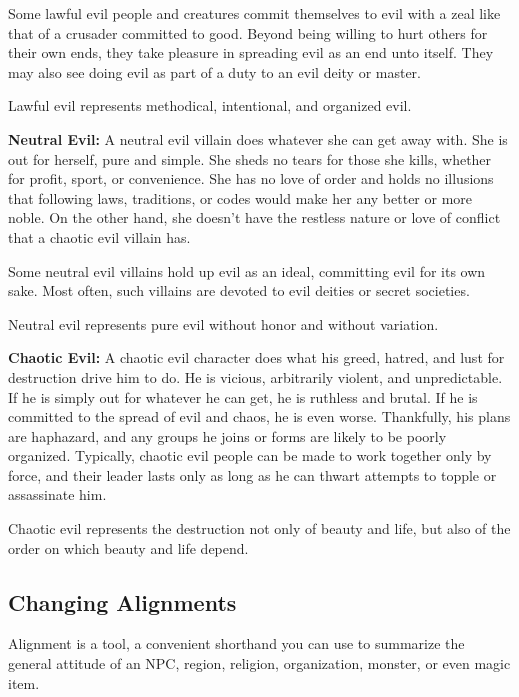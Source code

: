Some lawful evil people and creatures commit themselves to evil with a zeal like that of a crusader committed to good. Beyond being willing to hurt others for their own ends, they take pleasure in spreading evil as an end unto itself. They may also see doing evil as part of a duty to an evil deity or master.
				
Lawful evil represents methodical, intentional, and organized evil.
				
\textbf{Neutral Evil:} A neutral evil villain does whatever she can get away with. She is out for herself, pure and simple. She sheds no tears for those she kills, whether for profit, sport, or convenience. She has no love of order and holds no illusions that following laws, traditions, or codes would make her any better or more noble. On the other hand, she doesn't have the restless nature or love of conflict that a chaotic evil villain has.
				
Some neutral evil villains hold up evil as an ideal, committing evil for its own sake. Most often, such villains are devoted to evil deities or secret societies.
				
Neutral evil represents pure evil without honor and without variation.
				
\textbf{Chaotic Evil:} A chaotic evil character does what his greed, hatred, and lust for destruction drive him to do. He is vicious, arbitrarily violent, and unpredictable. If he is simply out for whatever he can get, he is ruthless and brutal. If he is committed to the spread of evil and chaos, he is even worse. Thankfully, his plans are haphazard, and any groups he joins or forms are likely to be poorly organized. Typically, chaotic evil people can be made to work together only by force, and their leader lasts only as long as he can thwart attempts to topple or assassinate him.
				
Chaotic evil represents the destruction not only of beauty and life, but also of the order on which beauty and life depend.
				
\subsection{Changing Alignments}

				
Alignment is a tool, a convenient shorthand you can use to summarize the general attitude of an NPC, region, religion, organization, monster, or even magic item. 
				
